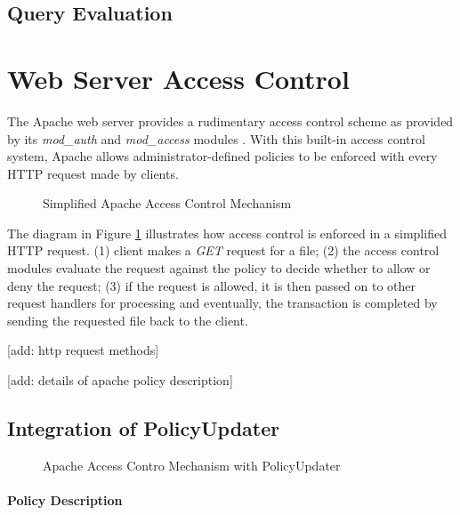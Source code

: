 \documentclass{llncs}
\begin{document}
    \subsection{Query Evaluation}

  \section{Web Server Access Control}

    The Apache web server provides a rudimentary access control scheme as
    provided by its {\em mod\_auth} and {\em mod\_access} modules
    \cite{AP,LAU}. With this built-in access control system, Apache allows 
    administrator-defined policies to be enforced with every HTTP request
    made by clients.

    \begin{figure}[ht]
      \begin{center}
        \caption{Simplified Apache Access Control Mechanism}
        \label{fig-1}
      \end{center}
    \end{figure}

    The diagram in Figure \ref{fig-1} illustrates how access control is
    enforced in a simplified HTTP request. (1) client makes a {\em GET}
    request for a file; (2) the access control modules evaluate the request
    against the policy to decide whether to allow or deny the request; (3) if
    the request is allowed, it is then passed on to other request handlers for
    processing and eventually, the transaction is completed by sending the
    requested file back to the client.

    [add: http request methods]

    [add: details of apache policy description]

    \subsection{Integration of PolicyUpdater}

      \begin{figure}[ht]
        \begin{center}
          \caption{Apache Access Contro Mechanism with PolicyUpdater}
          \label{fig-2}
        \end{center}
      \end{figure}

      \paragraph{\bf Policy Description}
\end{document}
